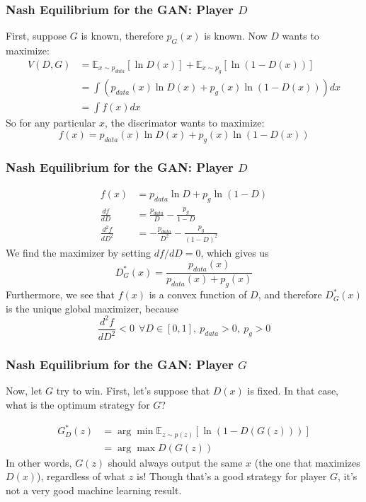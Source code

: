 \documentclass{beamer}
\begin{document}
\begin{frame}
  \frametitle{Nash Equilibrium for the GAN: Player $D$}

  First, suppose $G$ is known, therefore $p_G(x)$ is known.
  Now $D$ wants to maximize:
  \begin{align*}
    V(D,G) &= \mathbb{E}_{x\sim p_{data}}\left[\ln D(x)\right]
    +\mathbb{E}_{x\sim p_g}\left[\ln\left(1-D(x)\right)\right]\\
    &= \int \left(p_{data}(x)\ln D(x)+p_g(x)\ln\left(1-D(x)\right)\right)dx\\
    &= \int f(x)dx
  \end{align*}
  So for any particular $x$, the discrimator wants to maximize:
  \begin{displaymath}
    f(x)=p_{data}(x)\ln D(x)+p_g(x)\ln\left(1-D(x)\right)
  \end{displaymath}
\end{frame}
\begin{frame}
  \frametitle{Nash Equilibrium for the GAN: Player $D$}
  \begin{align*}
    f(x)&=p_{data}\ln D+p_g\ln\left(1-D\right)\\
    \frac{df}{dD} &= \frac{p_{data}}{D} - \frac{p_g}{1-D}\\
    \frac{d^2f}{dD^2} &= -\frac{p_{data}}{D^2} - \frac{p_g}{(1-D)^2}
  \end{align*}
  We find the maximizer by setting $df/dD=0$, which gives us
  \begin{displaymath}
    D^*_G(x) = \frac{p_{data}(x)}{p_{data}(x)+p_g(x)}
  \end{displaymath}
  Furthermore, we see that $f(x)$ is a convex function of $D$, and
  therefore $D^*_G(x)$ is the unique global maximizer, because
  \begin{displaymath}
    \frac{d^2f}{dD^2} < 0~~\forall D\in [0,1],~p_{data}>0,~p_g>0
  \end{displaymath}
\end{frame}

\begin{frame}
  \frametitle{Nash Equilibrium for the GAN: Player $G$}

  Now, let $G$ try to win. First, let's suppose that $D(x)$ is fixed.
  In that case, what is the optimum strategy for $G$?

  \begin{align*}
    G^*_D(z) &= \arg\min \mathbb{E}_{z\sim p(z)}\left[\ln\left(1-D(G(z))\right)\right]\\
    &= \arg\max D(G(z))
  \end{align*}
  In other words, $G(z)$ should always output the same $x$ (the one
  that maximizes $D(x)$), regardless of what $z$ is!  Though that's a
  good strategy for player $G$, it's not a very good machine learning
  result.
\end{frame}
\end{document}
